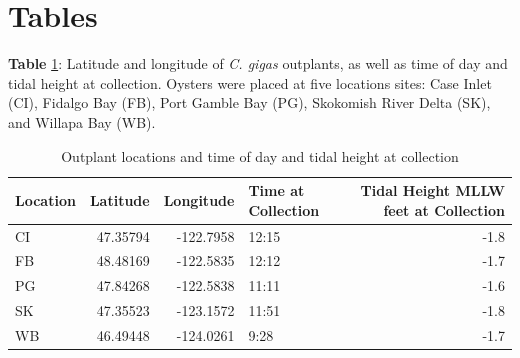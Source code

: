 \documentclass [11pt, proquest] {uwthesis}[2015/03/03]
\begin{document}
\clearpage

\hypertarget{tables}{%
\section{Tables}\label{tables}}

\textbf{Table} \ref{tab:deployment}: Latitude and longitude of \emph{C. gigas} outplants, as well as time of day and tidal height at collection. Oysters were placed at five locations sites: Case Inlet (CI), Fidalgo Bay (FB), Port Gamble Bay (PG), Skokomish River Delta (SK), and Willapa Bay (WB).

\begingroup\fontsize{10}{12}\selectfont
\begin{longtable}[t]{lrrlr}
\caption{\label{tab:deployment}Outplant locations and time of day and tidal height at collection}\\
\toprule
Location & Latitude & Longitude & Time at Collection & Tidal Height  MLLW  feet  at Collection\\
\midrule
CI & 47.35794 & -122.7958 & 12:15 & -1.8\\
FB & 48.48169 & -122.5835 & 12:12 & -1.7\\
PG & 47.84268 & -122.5838 & 11:11 & -1.6\\
SK & 47.35523 & -123.1572 & 11:51 & -1.8\\
WB & 46.49448 & -124.0261 & 9:28 & -1.7\\
\bottomrule
\end{longtable}
\endgroup{}
\clearpage
\end{document}
